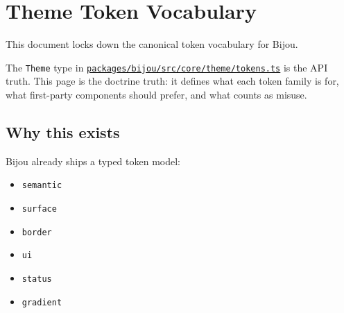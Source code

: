 \chapter{Theme Token Vocabulary}\label{record-028}

\smallskip

This document locks down the canonical token vocabulary for Bijou.

The \texttt{T\allowbreak{}h\allowbreak{}e\allowbreak{}m\allowbreak{}e} type in \href{https://github.com/flyingrobots/bijou/blob/cbd70612140e7a450d764b3c7be1c6af878b99bc/packages/bijou/src/core/theme/tokens.ts}{\texttt{p\allowbreak{}a\allowbreak{}c\allowbreak{}k\allowbreak{}a\allowbreak{}g\allowbreak{}e\allowbreak{}s\allowbreak{}/\allowbreak{}b\allowbreak{}i\allowbreak{}j\allowbreak{}o\allowbreak{}u\allowbreak{}/\allowbreak{}s\allowbreak{}r\allowbreak{}c\allowbreak{}/\allowbreak{}c\allowbreak{}o\allowbreak{}r\allowbreak{}e\allowbreak{}/\allowbreak{}t\allowbreak{}h\allowbreak{}e\allowbreak{}m\allowbreak{}e\allowbreak{}/\allowbreak{}t\allowbreak{}o\allowbreak{}k\allowbreak{}e\allowbreak{}n\allowbreak{}s\allowbreak{}.\allowbreak{}t\allowbreak{}s}} is the API truth. This page is the doctrine truth: it defines what each token family is for, what first-party components should prefer, and what counts as misuse.

\section{Why this exists}\label{record-028-why-this-exists}

Bijou already ships a typed token model:

\begin{itemize}
\tightlist
\item
  \texttt{s\allowbreak{}e\allowbreak{}m\allowbreak{}a\allowbreak{}n\allowbreak{}t\allowbreak{}i\allowbreak{}c}
\item
  \texttt{s\allowbreak{}u\allowbreak{}r\allowbreak{}f\allowbreak{}a\allowbreak{}c\allowbreak{}e}
\item
  \texttt{b\allowbreak{}o\allowbreak{}r\allowbreak{}d\allowbreak{}e\allowbreak{}r}
\item
  \texttt{u\allowbreak{}i}
\item
  \texttt{s\allowbreak{}t\allowbreak{}a\allowbreak{}t\allowbreak{}u\allowbreak{}s}
\item
  \texttt{g\allowbreak{}r\allowbreak{}a\allowbreak{}d\allowbreak{}i\allowbreak{}e\allowbreak{}n\allowbreak{}t}
\end{itemize}

